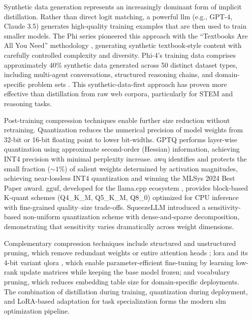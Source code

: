 Synthetic data generation represents an increasingly dominant form of implicit distillation. Rather than direct logit matching, a powerful \gls{llm} (e.g., GPT-4, Claude 3.5) generates high-quality training examples that are then used to train smaller models. The Phi series pioneered this approach with the ``Textbooks Are All You Need'' methodology \citep{gunasekar2023phi1}, generating synthetic textbook-style content with carefully controlled complexity and diversity. Phi-4's training data comprises approximately 40\% synthetic data generated across 50 distinct dataset types, including multi-agent conversations, structured reasoning chains, and domain-specific problem sets \citep{abdin2024phi4}. This synthetic-data-first approach has proven more effective than distillation from raw web corpora, particularly for STEM and reasoning tasks.

Post-training compression techniques enable further size reduction without retraining. Quantization reduces the numerical precision of model weights from 32-bit or 16-bit floating point to lower bit-widths. GPTQ \citep{frantar2023gptq} performs layer-wise quantization using approximate second-order (Hessian) information, achieving INT4 precision with minimal perplexity increase. \gls{awq} \citep{lin2024awq} identifies and protects the small fraction (${\sim}1\%$) of salient weights determined by activation magnitudes, achieving near-lossless INT4 quantization and winning the MLSys 2024 Best Paper award. \gls{gguf}, developed for the llama.cpp ecosystem \citep{gerganov2023llamacpp}, provides block-based K-quant schemes (Q4\_K\_M, Q5\_K\_M, Q8\_0) optimized for CPU inference with fine-grained quality--size trade-offs. SqueezeLLM \citep{kim2024squeezellm} introduced a sensitivity-based non-uniform quantization scheme with dense-and-sparse decomposition, demonstrating that sensitivity varies dramatically across weight dimensions.

Complementary compression techniques include structured and unstructured pruning, which remove redundant weights or entire attention heads \citep{frantar2023sparsegpt}; \gls{lora} \citep{hu2022lora} and its 4-bit variant \gls{qlora} \citep{dettmers2023qlora}, which enable parameter-efficient fine-tuning by learning low-rank update matrices while keeping the base model frozen; and vocabulary pruning, which reduces embedding table size for domain-specific deployments. The combination of distillation during training, quantization during deployment, and LoRA-based adaptation for task specialization forms the modern \gls{slm} optimization pipeline.

